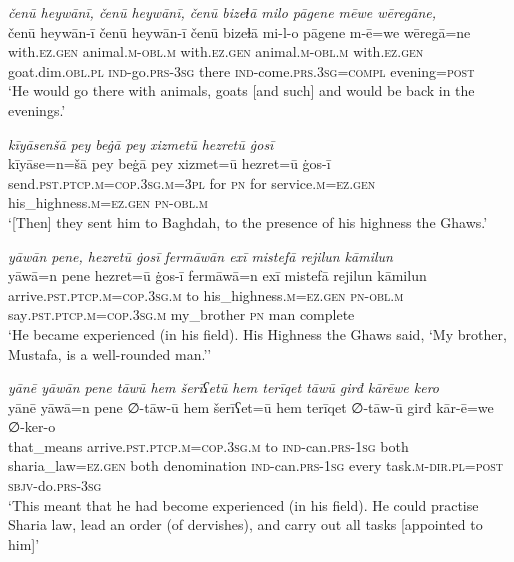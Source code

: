 \ea \label{ZP.12}
\textit{čenū heywānī, čenū heywānī, čenū bizeɫā milo pāgene mēwe wēregāne,} \\ 
\gll čenū heywān-ī čenū heywān-ī čenū bizeɫā mi-l-o pāgene m-ē=we wēregā=ne \\ 
 with\textsc{.ez.gen} animal\textsc{.m}\textsc{-obl}\textsc{.m} with\textsc{.ez.gen} animal\textsc{.m}\textsc{-obl}\textsc{.m} with\textsc{.ez.gen} goat.dim\textsc{.obl}\textsc{.pl} \textsc{ind-}go\textsc{.prs}\textsc{-3sg} there \textsc{ind-}come\textsc{.prs}\textsc{.3sg}\textsc{=compl} evening\textsc{=\textsc{post}} \\ 
\glt `He would go there with animals, goats [and such] and would be back in the evenings.'
\z 
 
\ea \label{ZP.14}
\textit{kīyāsenšā pey beġā pey xizmetū hezretū ġosī} \\ 
\gll kīyāse=n=šā pey beġā pey xizmet=ū hezret=ū ġos-ī \\ 
 send\textsc{.pst}\textsc{.ptcp}\textsc{.m}\textsc{=cop}\textsc{.3sg}\textsc{.m}\textsc{=3pl} for \textsc{pn} for service\textsc{.m}\textsc{\textsc{=ez.gen}} his\_highness\textsc{.m}\textsc{\textsc{=ez.gen}} \textsc{pn}\textsc{-obl}\textsc{.m} \\ 
\glt `[Then] they sent him to Baghdah, to the presence of his highness the Ghaws.'
\z 
 
\ea \label{ZP.18}
\textit{yāwān pene, hezretū ġosī fermāwān exī mistefā rejilun kāmilun} \\ 
\gll yāwā=n pene hezret=ū ġos-ī fermāwā=n exī mistefā rejilun kāmilun \\ 
 arrive\textsc{.pst}\textsc{.ptcp}\textsc{.m}\textsc{=cop}\textsc{.3sg}\textsc{.m} to his\_highness\textsc{.m}\textsc{\textsc{=ez.gen}} \textsc{pn}\textsc{-obl}\textsc{.m} say\textsc{.pst}\textsc{.ptcp}\textsc{.m}\textsc{=cop}\textsc{.3sg}\textsc{.m} my\_brother \textsc{pn} man complete \\ 
\glt `He became experienced (in his field). His Highness the Ghaws said, ‘My brother, Mustafa, is a well-rounded man.’'
\z 
 
\ea \label{ZP.19}
\textit{yānē yāwān pene tāwū hem šerīʕetū hem terīqet tāwū girđ kārēwe kero} \\ 
\gll yānē yāwā=n pene ∅-tāw-ū hem šerīʕet=ū hem terīqet ∅-tāw-ū girđ kār-ē=we ∅-ker-o \\ 
 that\_means arrive\textsc{.pst}\textsc{.ptcp}\textsc{.m}\textsc{=cop}\textsc{.3sg}\textsc{.m} to \textsc{ind-}can\textsc{.prs}\textsc{-\textsc{1sg}} both sharia\_law\textsc{\textsc{=ez.gen}} both denomination \textsc{ind-}can\textsc{.prs}\textsc{-\textsc{1sg}} every task\textsc{.m}\textsc{-dir}\textsc{.pl}\textsc{=\textsc{post}} \textsc{sbjv-}do\textsc{.prs}\textsc{-3sg} \\ 
\glt `This meant that he had become experienced (in his field). He could practise Sharia law, lead an order (of dervishes), and carry out all tasks [appointed to him]'
\z 
 
